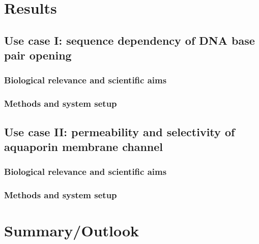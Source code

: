 \documentclass[11pt,a4paper]{article}
\begin{document}
\section{Results}
\subsection{Use case I: sequence dependency of DNA base pair opening}
\subsubsection{Biological relevance and scientific aims}

\subsubsection{Methods and system setup}

\subsection{Use case II: permeability and selectivity of aquaporin membrane channel}
\subsubsection{Biological relevance and scientific aims}
\cite{lindahl2018permeability}
\subsubsection{Methods and system setup}

\section{Summary/Outlook}


\end{document}
